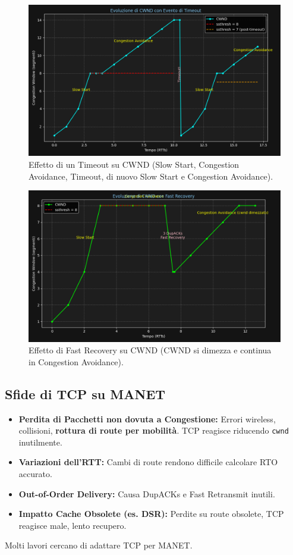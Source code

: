 \begin{figure}[H]
    \centering
    \includegraphics[width=1\textwidth]{images/cwnd_timeout.png}
    \caption{Effetto di un Timeout su CWND (Slow Start, Congestion Avoidance, Timeout, di nuovo Slow Start e Congestion Avoidance).}
    \label{fig:cwnd_timeout}
\end{figure}

\begin{figure}[H]
    \centering
    \includegraphics[width=1\textwidth]{images/cwnd_fastrecovery.png}
    \caption{Effetto di Fast Recovery su CWND (CWND si dimezza e continua in Congestion Avoidance).}
    \label{fig:cwnd_fastrecovery}
\end{figure}


\subsection{Sfide di TCP su MANET}
\begin{itemize}
    \item \textbf{Perdita di Pacchetti non dovuta a Congestione:} Errori wireless, collisioni, \textbf{rottura di route per mobilità}. TCP reagisce riducendo \texttt{cwnd} inutilmente.
    \item \textbf{Variazioni dell'RTT:} Cambi di route rendono difficile calcolare RTO accurato.
    \item \textbf{Out-of-Order Delivery:} Causa DupACKs e Fast Retransmit inutili.
    \item \textbf{Impatto Cache Obsolete (es. DSR):} Perdite su route obsolete, TCP reagisce male, lento recupero.
\end{itemize}
Molti lavori cercano di adattare TCP per MANET.

